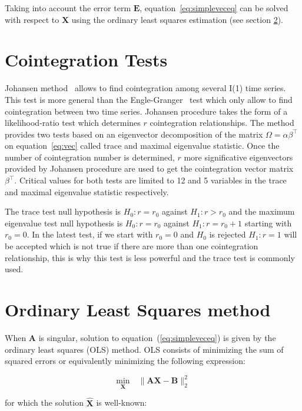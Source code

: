 Taking into account the error term $\mathbf{E}$, equation~\ref{eq:simpleveceq}
can be solved with respect to $\mathbf{X}$ using the ordinary least
squares estimation (see section \ref{sec:OLS}).
\section{Cointegration Tests}

Johansen method~\cite{johansen1988} allows to find cointegration among several
I(1) time series. This test is more general than the
Engle-Granger~\cite{engle1987} test which only allow to find cointegration
between two time series.  Johansen procedure takes the form of a
likelihood-ratio test which determines $r$ cointegration relationships. The
method provides two tests based on an eigenvector decomposition of the matrix
$\Omega = \alpha \beta^\top$ on equation~\ref{eq:vec} called trace and maximal
eigenvalue statistic.  Once the number of cointegration number is determined,
$r$ more significative eigenvectors provided by Johansen procedure are used to
get the cointegration vector matrix $\beta^\top$.  Critical values for both
tests are limited to 12 and 5 variables in the trace and maximal eigenvalue
statistic respectively.

The trace test null hypothesis is $H_0: r = r_0$ against $H_1: r > r_0$ and the
maximum eigenvalue test null hypothesis is $H_0: r = r_0$ against $H_1: r =
r_0+1$ starting with $r_0 = 0$.  In the latest test, if we start with $r_0=0$
and $H_0$ is rejected $H_1: r = 1$ will be accepted which is not true if there
are more than one cointegration relationship, this is why this test is less
powerful and the trace test is commonly used.


\section{Ordinary Least Squares method} \label{sec:OLS}

When $\mathbf{A}$ is singular, solution to equation~(\ref{eq:simpleveceq}) is given
by the ordinary least squares (OLS) method. OLS consists of minimizing the sum
of squared errors or equivalently minimizing the following expression:

\begin{equation}
\label{eq:regressionproblem}
\underset{\mathbf{X}}{\text{min}} \quad \| \mathbf{A}\mathbf{\mathbf{X}} - \mathbf{B} \|_2^2
\end{equation}

\noindent for which the solution $\hat{\mathbf{X}}$ is well-known:

